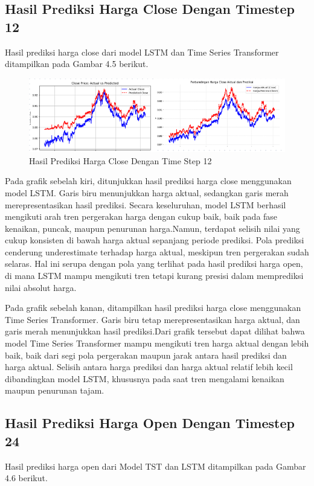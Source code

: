 \subsection{Hasil Prediksi Harga Close Dengan Timestep 12}
Hasil prediksi harga close dari model LSTM dan Time Series Transformer ditampilkan pada Gambar 4.5 berikut.
\begin{figure} [H] \centering
    \includegraphics[scale=1.1]{gambar/perbandingan close(12).png} 
    \caption{Hasil Prediksi Harga Close Dengan Time Step 12}
    \label{fig:label_gambar}
\end{figure}

Pada grafik sebelah kiri, ditunjukkan hasil prediksi harga close menggunakan model LSTM. Garis biru menunjukkan harga aktual, sedangkan garis merah merepresentasikan hasil prediksi. Secara keseluruhan, model LSTM berhasil mengikuti arah tren pergerakan harga dengan cukup baik, baik pada fase kenaikan, puncak, maupun penurunan harga.Namun, terdapat selisih nilai yang cukup konsisten di bawah harga aktual sepanjang periode prediksi. Pola prediksi cenderung underestimate terhadap harga aktual, meskipun tren pergerakan sudah selaras. Hal ini serupa dengan pola yang terlihat pada hasil prediksi harga open, di mana LSTM mampu mengikuti tren tetapi kurang presisi dalam memprediksi nilai absolut harga.

Pada grafik sebelah kanan, ditampilkan hasil prediksi harga close menggunakan Time Series Transformer. Garis biru tetap merepresentasikan harga aktual, dan garis merah menunjukkan hasil prediksi.Dari grafik tersebut dapat dilihat bahwa model Time Series Transformer mampu mengikuti tren harga aktual dengan lebih baik, baik dari segi pola pergerakan maupun jarak antara hasil prediksi dan harga aktual. Selisih antara harga prediksi dan harga aktual relatif lebih kecil dibandingkan model LSTM, khususnya pada saat tren mengalami kenaikan maupun penurunan tajam.

\subsection{Hasil Prediksi Harga Open Dengan Timestep 24}
Hasil prediksi harga open dari Model TST dan LSTM ditampilkan pada Gambar 4.6 berikut.


